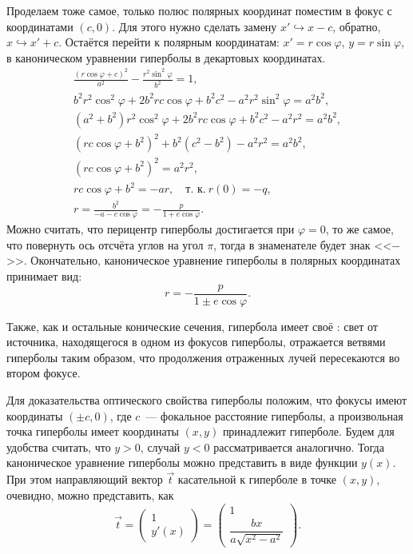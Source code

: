 Проделаем тоже самое, только полюс полярных координат поместим в фокус с координатами $(c,0)$. Для этого нужно сделать замену $x' \hookrightarrow x - c$, обратно, $x \hookrightarrow x' + c$. Остаётся перейти к полярным координатам: $x' = r \cos \varphi$, $y = r \sin \varphi$, в каноническом уравнении гиперболы в декартовых координатах.
\begin{gather*}
	\frac{(r \cos \varphi + c)^2}{a^2} - \frac{r^2 \sin^2 \varphi}{b^2} = 1,\\
	 b^2 r^2 \cos^2 \varphi + 2 b^2 r c \cos \varphi + b^2 c^2 - a^2 r^2 \sin^2 \varphi = a^2 b^2,\\
	 (a^2 + b^2) r^2 \cos^2 \varphi + 2 b^2 r c \cos \varphi + b^2 c^2 - a^2 r^2 = a^2 b^2,\\
	(rc\cos \varphi + b^2)^2 + b^2(c^2 - b^2) - a^2 r^2 = a^2 b^2,\\
	(rc\cos \varphi + b^2)^2 = a^2 r^2,\\
	rc\cos \varphi + b^2 = -a r,\quad\text{т. к.}~r(0) = -q,\\
	r = \frac{b^2}{-a - c \cos \varphi} = - \frac{p}{1 + e \cos \varphi}.
\end{gather*}
Можно считать, что перицентр гиперболы достигается при $\varphi = 0$, то же самое, что повернуть ось отсчёта углов на угол $\pi$, тогда в знаменателе будет знак <<$-$>>. Окончательно, каноническое уравнение гиперболы в полярных координатах принимает вид:
\begin{equation}
	r = -\frac{p}{1 \pm e \cos \varphi}.
\end{equation}

Также, как и остальные конические сечения, гипербола имеет своё : свет от источника, находящегося в одном из фокусов гиперболы, отражается ветвями гиперболы таким образом, что продолжения отраженных лучей пересекаются во втором фокусе.

Для доказательства оптического свойства гиперболы положим, что фокусы имеют координаты $(\pm c, 0)$, где $c$~--- фокальное расстояние гиперболы, а произвольная точка гиперболы имеет координаты $(x, y)$ принадлежит гиперболе. Будем для удобства считать, что $y > 0$, случай $y < 0$ рассматривается аналогично. Тогда каноническое уравнение гиперболы можно представить в виде функции $y(x)$. При этом направляющий вектор $\vec t$ касательной к гиперболе в точке $(x, y)$, очевидно, можно представить, как
\begin{equation*}
	\vec t = 
	\begin{pmatrix}
		1\\
		y'(x)
	\end{pmatrix} = 
	\begin{pmatrix}
		1\\
		\dfrac{bx}{a \sqrt{x^2 - a^2}}
	\end{pmatrix}.
\end{equation*}

